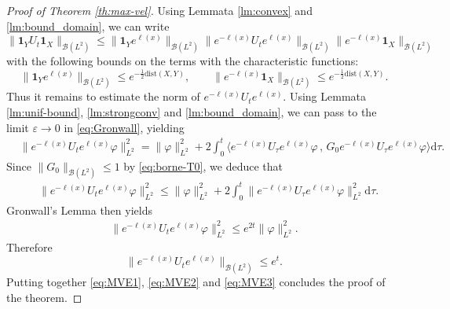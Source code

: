 \documentclass[12pt]{article}
\newcommand{\dXY}{{\mathrm{dist}(X,Y)}}
\newcommand{\Tzero}{{G_0}}
\theoremstyle{plain}
\begin{document}
\begin{proof}[Proof of Theorem \ref{th:max-vel}]
Using Lemmata \ref{lm:convex} and \ref{lm:bound_domain}, we can write
\begin{equation}
     \|\mathbf{1}_YU_t\mathbf{1}_X\|_{\mathcal{B}(L^2)}
    \le \|\mathbf{1}_Ye^{\ell(x)}\|_{\mathcal{B}(L^2)}\|e^{-\ell(x)}U_te^{\ell(x)}\|_{\mathcal{B}(L^2)}\|e^{-\ell(x)}\mathbf{1}_X\|_{\mathcal{B}(L^2)} \label{eq:MVE1}
\end{equation}
with the following bounds on the terms with the characteristic functions:
\begin{equation}
    \|\mathbf{1}_Ye^{\ell(x)}\|_{\mathcal{B}(L^2)}\le e^{-\frac12\dXY}, \qquad \|e^{-\ell(x)}\mathbf{1}_X\|_{\mathcal{B}(L^2)}\le e^{-\frac12\dXY}.\label{eq:MVE2}
\end{equation}
Thus it remains to estimate the norm of  $e^{-\ell(x)}U_te^{\ell(x)}$. Using Lemmata \ref{lm:unif-bound}, \ref{lm:strongconv} and \ref{lm:bound_domain}, we can pass to the limit $\varepsilon\to0$ in \eqref{eq:Gronwall}, yielding
\begin{align}
    &\big\|e^{-\ell(x)}U_te^{\ell(x)}\varphi\big\|_{L^2}^2=\|\varphi\|_{L^2}^2+2\int_0^t\big\langle e^{-\ell(x)}U_\tau e^{\ell(x)}\varphi \, , \,  \Tzero e^{-\ell(x)}U_\tau e^{\ell(x)}\varphi\big\rangle\mathrm{d}\tau. \label{eq:bound_for_Gronwall}
\end{align}
Since $\|\Tzero\|_{\mathcal{B}(L^2)}\le1$ by \eqref{eq:borne-T0}, we deduce that
\begin{align*}
    &\big\|e^{-\ell(x)}U_te^{\ell(x)}\varphi\big\|_{L^2}^2
    \le\|\varphi\|_{L^2}^2+2\int_0^t\big\| e^{-\ell(x)}U_\tau e^{\ell(x)}\varphi\big\|_{L^2}^2\mathrm{d}\tau.
\end{align*}
Gronwall's Lemma then yields
\begin{align*}
    \big\|e^{-\ell(x)}U_te^{\ell(x)}\varphi\big\|_{L^2}^2\le e^{2t}\|\varphi\|_{L^2}^2.
\end{align*}
Therefore
\begin{equation}
    \big\|e^{-\ell(x)}U_te^{\ell(x)}\big\|_{\mathcal{B}(L^2)}\le e^t.\label{eq:MVE3}
\end{equation}
Putting together \eqref{eq:MVE1}, \eqref{eq:MVE2} and \eqref{eq:MVE3} concludes the proof of the theorem.
\end{proof}
\end{document}
